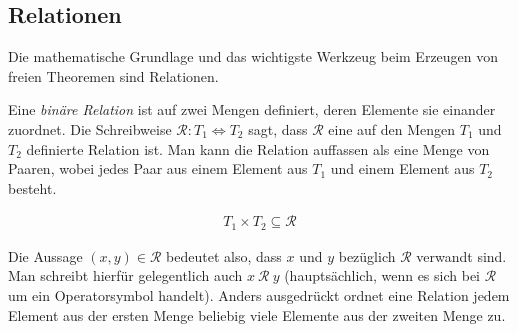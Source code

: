 





\subsection{Relationen}

Die mathematische Grundlage und das wichtigste Werkzeug beim Erzeugen von freien Theoremen sind Relationen.


Eine \textit{binäre Relation} ist auf zwei Mengen definiert, deren Elemente sie einander zuordnet. Die Schreibweise
$\mathcal{R} : T_1 \Leftrightarrow T_2$ sagt, dass $\mathcal{R}$ eine auf den Mengen $T_1$ und $T_2$ definierte
Relation ist. Man kann die Relation auffassen als eine Menge von Paaren, wobei jedes Paar aus einem Element aus $T_1$ und einem
Element aus $T_2$ besteht.

\begin{align*}
T_1 \times T_2 \subseteq \mathcal{R}
\end{align*}

Die Aussage $(x, y) \in \mathcal{R}$ bedeutet also, dass $x$ und $y$ bezüglich $\mathcal{R}$ verwandt sind. Man schreibt hierfür
gelegentlich auch $x\ \mathcal{R}\ y$ (hauptsächlich, wenn es sich bei $\mathcal{R}$ um ein Operatorsymbol handelt).
Anders ausgedrückt ordnet eine Relation jedem Element aus der ersten Menge beliebig viele Elemente aus der zweiten Menge zu.

